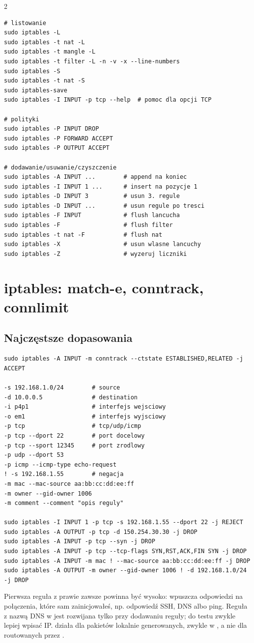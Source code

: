 \documentclass[9pt,a4paper,landscape]{article}
\newcommand{\code}[1]{\texttt{\detokenize{#1}}}
\begin{document}
\begin{multicols*}{2}
\begin{lstlisting}
# listowanie
sudo iptables -L
sudo iptables -t nat -L
sudo iptables -t mangle -L
sudo iptables -t filter -L -n -v -x --line-numbers
sudo iptables -S
sudo iptables -t nat -S
sudo iptables-save
sudo iptables -I INPUT -p tcp --help  # pomoc dla opcji TCP

# polityki
sudo iptables -P INPUT DROP
sudo iptables -P FORWARD ACCEPT
sudo iptables -P OUTPUT ACCEPT

# dodawanie/usuwanie/czyszczenie
sudo iptables -A INPUT ...        # append na koniec
sudo iptables -I INPUT 1 ...      # insert na pozycje 1
sudo iptables -D INPUT 3          # usun 3. regule
sudo iptables -D INPUT ...        # usun regule po tresci
sudo iptables -F INPUT            # flush lancucha
sudo iptables -F                  # flush filter
sudo iptables -t nat -F           # flush nat
sudo iptables -X                  # usun wlasne lancuchy
sudo iptables -Z                  # wyzeruj liczniki
\end{lstlisting}

\columnbreak
\section{iptables: match-e, conntrack, connlimit}
\subsection{Najczęstsze dopasowania}
\begin{lstlisting}
sudo iptables -A INPUT -m conntrack --ctstate ESTABLISHED,RELATED -j ACCEPT

-s 192.168.1.0/24        # source
-d 10.0.0.5              # destination
-i p4p1                  # interfejs wejsciowy
-o em1                   # interfejs wyjsciowy
-p tcp                   # tcp/udp/icmp
-p tcp --dport 22        # port docelowy
-p tcp --sport 12345     # port zrodlowy
-p udp --dport 53
-p icmp --icmp-type echo-request
! -s 192.168.1.55        # negacja
-m mac --mac-source aa:bb:cc:dd:ee:ff
-m owner --gid-owner 1006
-m comment --comment "opis reguly"

sudo iptables -I INPUT 1 -p tcp -s 192.168.1.55 --dport 22 -j REJECT
sudo iptables -A OUTPUT -p tcp -d 150.254.30.30 -j DROP
sudo iptables -A INPUT -p tcp --syn -j DROP
sudo iptables -A INPUT -p tcp --tcp-flags SYN,RST,ACK,FIN SYN -j DROP
sudo iptables -A INPUT -m mac ! --mac-source aa:bb:cc:dd:ee:ff -j DROP
sudo iptables -A OUTPUT -m owner --gid-owner 1006 ! -d 192.168.1.0/24 -j DROP
\end{lstlisting}
Pierwsza reguła z \code{conntrack} prawie zawsze powinna być wysoko: wpuszcza odpowiedzi na połączenia, które sam zainicjowałeś, np. odpowiedź SSH, DNS albo ping. Reguła z nazwą DNS w \code{-d} jest rozwijana tylko przy dodawaniu reguły; do testu zwykle lepiej wpisać IP. \code{owner} działa dla pakietów lokalnie generowanych, zwykle w \code{OUTPUT}, a nie dla routowanych przez \code{FORWARD}.


\end{multicols*}
\end{document}
